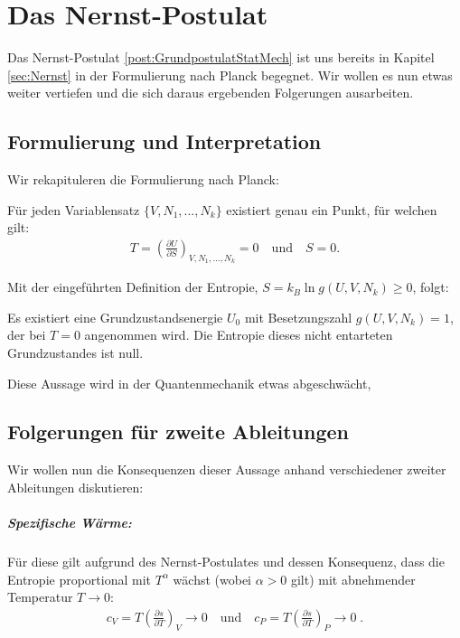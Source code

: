 
\chapter{Das Nernst-Postulat\label{sec:nernst_postulat}}
Das Nernst-Postulat \ref{post:GrundpostulatStatMech} ist uns bereits in Kapitel \ref{sec:Nernst} in der Formulierung nach Planck begegnet. Wir wollen es nun etwas weiter vertiefen und die sich daraus ergebenden Folgerungen ausarbeiten.
\section{Formulierung und Interpretation}
Wir rekapituleren die Formulierung nach Planck:
\begin{formal}
     Für jeden Variablensatz $\{V,N_1,...,N_k\}$ existiert genau ein Punkt, für welchen gilt:
    \begin{align*}
        T=\left(\frac{\partial U}{\partial S}\right)_{V,N_1,...,N_k}=0\quad \mathrm{und}\quad S=0.
    \end{align*}
\end{formal}
Mit der eingeführten Definition der Entropie, $S=k_B\ln g(U,V,N_k)\geq 0$, folgt: \begin{formal}
    Es existiert eine Grundzustandsenergie $U_0$ mit Besetzungszahl $g(U,V,N_k)=1$, der bei $T=0$ angenommen wird. Die Entropie dieses nicht entarteten Grundzustandes ist null.
\end{formal}
Diese Aussage wird in der Quantenmechanik etwas abgeschwächt, 

\section{Folgerungen für zweite Ableitungen} Wir wollen nun die Konsequenzen dieser Aussage anhand verschiedener zweiter Ableitungen diskutieren:
\paragraph*{Spezifische Wärme:} Für diese gilt aufgrund des Nernst-Postulates und dessen Konsequenz, dass die Entropie proportional mit $T^\alpha$ wächst (wobei $\alpha>0$ gilt) mit abnehmender Temperatur $T\rightarrow 0$:
    \begin{align*}
        \boxed{c_V=T\left(\frac{\partial s}{\partial T}\right)_V\rightarrow 0 \quad\mathrm{und}\quad c_P=T\left(\frac{\partial s}{\partial T}\right)_P\rightarrow 0 }\;.
    \end{align*}
